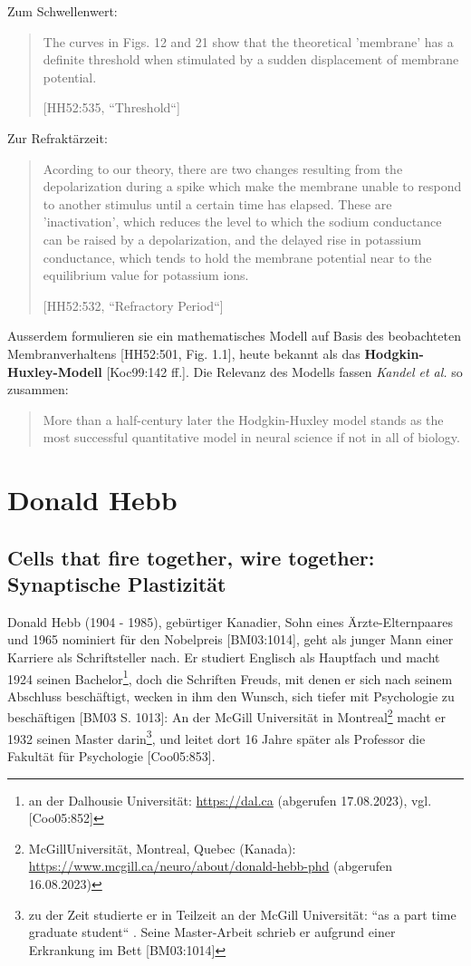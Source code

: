 Zum Schwellenwert:
\blockquote[{[HH52:535, ``Threshold``]}]{
    The curves in Figs. 12 and 21 show that the theoretical 'membrane' has a definite threshold when stimulated by a sudden displacement of membrane potential.
}

Zur Refraktärzeit:
\blockquote[{[HH52:532, ``Refractory Period``]}]{
    Acording to our theory, there are two changes resulting from the depolarization during a spike which make the membrane unable to respond to another stimulus until a certain time has elapsed. These are 'inactivation', which reduces the level to which the sodium conductance can be raised by a depolarization, and the delayed rise in potassium conductance, which tends to hold the membrane potential near to the equilibrium value for potassium ions.
}

Ausserdem formulieren sie ein mathematisches Modell auf Basis des beobachteten Membranverhaltens [HH52:501, Fig. 1.1], heute bekannt als das \textbf{Hodgkin-Huxley-Modell} [Koc99:142 ff.].
 Die Relevanz des Modells fassen \textit{Kandel et al.} so zusammen:

\blockquote[{\cite[156]{KSJ+13}}]{
    More than a half-century later the Hodgkin-Huxley model stands as the most successful quantitative model in neural science if not in all of biology.
}

\section{Donald Hebb}\label{appendix:hebb}
\subsection*{Cells that fire together, wire together: Synaptische Plastizität}

Donald Hebb (1904 - 1985), gebürtiger Kanadier, Sohn eines Ärzte-Elternpaares und 1965 nominiert für den Nobelpreis [BM03:1014], geht als junger Mann einer Karriere als Schriftsteller nach.
Er studiert Englisch als Hauptfach und macht 1924 seinen Bachelor\footnote{
    an der Dalhousie Universität: \url{https://dal.ca} (abgerufen 17.08.2023), vgl. [Coo05:852]
}, doch die Schriften Freuds, mit denen er sich nach seinem Abschluss beschäftigt, wecken in ihm den Wunsch, sich tiefer mit Psychologie zu beschäftigen [BM03 S. 1013]: An der McGill Universität in Montreal\footnote{
    McGillUniversität, Montreal, Quebec (Kanada): \url{https://www.mcgill.ca/neuro/about/donald-hebb-phd} (abgerufen 16.08.2023)
} macht er 1932 seinen Master darin\footnote{
    zu der Zeit studierte er in Teilzeit an der McGill Universität: ``as a part time graduate student`` \cite{[Kle99:1]}. Seine Master-Arbeit schrieb er aufgrund einer Erkrankung im Bett [BM03:1014]
}, und leitet dort 16 Jahre später als Professor die Fakultät für Psychologie [Coo05:853].

